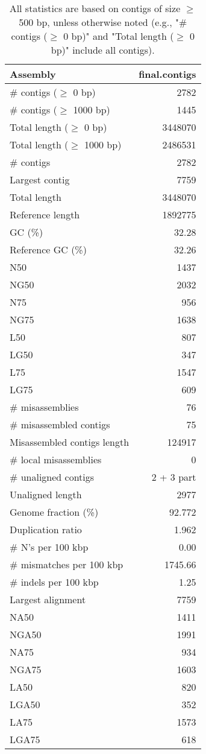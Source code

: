\documentclass[12pt,a4paper]{article}
\begin{document}
\begin{table}[ht]
\begin{center}
\caption{All statistics are based on contigs of size $\geq$ 500 bp, unless otherwise noted (e.g., "\# contigs ($\geq$ 0 bp)" and "Total length ($\geq$ 0 bp)" include all contigs).}
\begin{tabular}{|l*{1}{|r}|}
\hline
Assembly & final.contigs \\ \hline
\# contigs ($\geq$ 0 bp) & 2782 \\ \hline
\# contigs ($\geq$ 1000 bp) & 1445 \\ \hline
Total length ($\geq$ 0 bp) & 3448070 \\ \hline
Total length ($\geq$ 1000 bp) & 2486531 \\ \hline
\# contigs & 2782 \\ \hline
Largest contig & 7759 \\ \hline
Total length & 3448070 \\ \hline
Reference length & 1892775 \\ \hline
GC (\%) & 32.28 \\ \hline
Reference GC (\%) & 32.26 \\ \hline
N50 & 1437 \\ \hline
NG50 & 2032 \\ \hline
N75 & 956 \\ \hline
NG75 & 1638 \\ \hline
L50 & 807 \\ \hline
LG50 & 347 \\ \hline
L75 & 1547 \\ \hline
LG75 & 609 \\ \hline
\# misassemblies & 76 \\ \hline
\# misassembled contigs & 75 \\ \hline
Misassembled contigs length & 124917 \\ \hline
\# local misassemblies & 0 \\ \hline
\# unaligned contigs & 2 + 3 part \\ \hline
Unaligned length & 2977 \\ \hline
Genome fraction (\%) & 92.772 \\ \hline
Duplication ratio & 1.962 \\ \hline
\# N's per 100 kbp & 0.00 \\ \hline
\# mismatches per 100 kbp & 1745.66 \\ \hline
\# indels per 100 kbp & 1.25 \\ \hline
Largest alignment & 7759 \\ \hline
NA50 & 1411 \\ \hline
NGA50 & 1991 \\ \hline
NA75 & 934 \\ \hline
NGA75 & 1603 \\ \hline
LA50 & 820 \\ \hline
LGA50 & 352 \\ \hline
LA75 & 1573 \\ \hline
LGA75 & 618 \\ \hline
\end{tabular}
\end{center}
\end{table}
\end{document}
